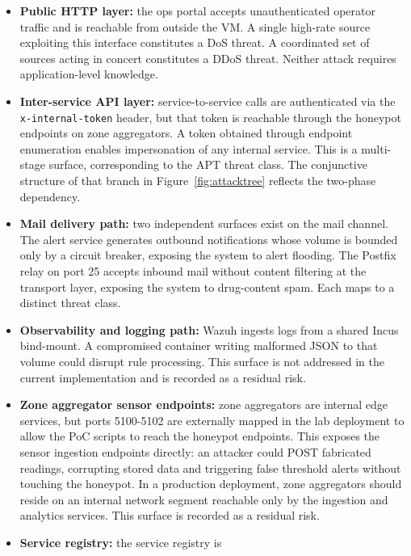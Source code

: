 \begin{itemize}[leftmargin=*]
  \item \textbf{Public HTTP layer:} the ops portal accepts
        unauthenticated operator traffic and is reachable from outside the VM.
        A single high-rate source exploiting this interface constitutes a DoS
        threat. A coordinated set of sources acting in concert constitutes a
        DDoS threat. Neither attack requires application-level knowledge.
  \item \textbf{Inter-service API layer:} service-to-service calls are
        authenticated via the \texttt{x-internal-token} header, but that token
        is reachable through the honeypot endpoints on zone aggregators. A token
        obtained through endpoint enumeration enables impersonation of any
        internal service. This is a multi-stage surface, corresponding to the
        APT threat class. The conjunctive structure of that branch in
        Figure~\ref{fig:attacktree} reflects the two-phase dependency.
  \item \textbf{Mail delivery path:} two independent surfaces exist on the mail
        channel. The alert service generates outbound notifications whose volume
        is bounded only by a circuit breaker, exposing the system to alert
        flooding. The Postfix relay on port 25 accepts inbound mail without
        content filtering at the transport layer, exposing the system to
        drug-content spam. Each maps to a distinct threat class.
  \item \textbf{Observability and logging path:} Wazuh ingests logs from a
        shared Incus bind-mount. A compromised container writing malformed JSON
        to that volume could disrupt rule processing. This surface is not
        addressed in the current implementation and is recorded as a residual
        risk.
  \item \textbf{Zone aggregator sensor endpoints:} zone aggregators are
        internal edge services, but ports 5100-5102 are externally mapped in
        the lab deployment to allow the PoC scripts to reach the honeypot
        endpoints. This exposes the sensor ingestion endpoints directly: an
        attacker could POST fabricated readings, corrupting stored data and
        triggering false threshold alerts without touching the honeypot. In a
        production deployment, zone aggregators should reside on an internal
        network segment reachable only by the ingestion and analytics services.
        This surface is recorded as a residual risk.
  \item \textbf{Service registry:} the service registry is

\end{itemize}
